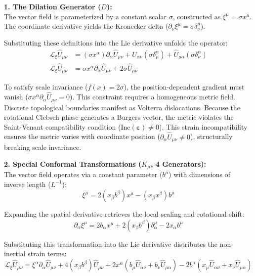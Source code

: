 \textbf{1. The Dilation Generator ($D$):} \\
The vector field is parameterized by a constant scalar $\sigma$, constructed as $\xi^\mu = \sigma x^\mu$. The coordinate derivative yields the Kronecker delta ($\partial_\nu \xi^\mu = \sigma \delta^\mu_\nu$).

Substituting these definitions into the Lie derivative unfolds the operator:
\begin{align}
    \mathcal{L}_\xi \hat{U}_{\mu\nu} &= (\sigma x^\alpha) \partial_\alpha \hat{U}_{\mu\nu} + \hat{U}_{\alpha\nu} (\sigma \delta^\alpha_\mu) + \hat{U}_{\mu\alpha} (\sigma \delta^\alpha_\nu) \nonumber \\
    \mathcal{L}_\xi \hat{U}_{\mu\nu} &= \sigma x^\alpha \partial_\alpha \hat{U}_{\mu\nu} + 2\sigma \hat{U}_{\mu\nu} \label{eq:dilation_expansion}
\end{align}

To satisfy scale invariance ($f(x) = 2\sigma$), the position-dependent gradient must vanish ($\sigma x^\alpha \partial_\alpha \hat{U}_{\mu\nu} = 0$). This constraint requires a homogeneous metric field. Discrete topological boundaries manifest as Volterra dislocations. Because the rotational Clebsch phase generates a Burgers vector, the metric violates the Saint-Venant compatibility condition ($\text{Inc}(\boldsymbol{\varepsilon}) \neq 0$). This strain incompatibility ensures the metric varies with coordinate position ($\partial_\alpha \hat{U}_{\mu\nu} \neq 0$), structurally breaking scale invariance. 
\vspace{0.2 cm}

\textbf{2. Special Conformal Transformations ($K_\mu$, 4 Generators):} \\
The vector field operates via a constant parameter ($b^\mu$) with dimensions of inverse length ($L^{-1}$):
\begin{equation}
    \xi^\mu = 2(x_\beta b^\beta)x^\mu - (x_\beta x^\beta)b^\mu
\end{equation}

Expanding the spatial derivative retrieves the local scaling and rotational shift:
\begin{equation}
    \partial_\alpha \xi^\mu = 2 b_\alpha x^\mu + 2(x_\beta b^\beta)\delta^\mu_\alpha - 2x_\alpha b^\mu
\end{equation}

Substituting this transformation into the Lie derivative distributes the non-inertial strain terms:
\begin{equation}
    \mathcal{L}_\xi \hat{U}_{\mu\nu} = \xi^\alpha \partial_\alpha \hat{U}_{\mu\nu} + 4(x_\beta b^\beta)\hat{U}_{\mu\nu} + 2x^\alpha(b_\mu \hat{U}_{\alpha\nu} + b_\nu \hat{U}_{\mu\alpha}) - 2b^\alpha(x_\mu \hat{U}_{\alpha\nu} + x_\nu \hat{U}_{\mu\alpha})
\end{equation}


